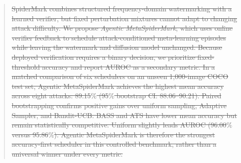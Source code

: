 \begin{abstract}
\sout{
SpiderMark combines structured frequency-domain watermarking with a learned verifier, but fixed perturbation mixtures cannot adapt to changing attack difficulty. We propose \emph{Agentic MetaSpiderMark}, which uses online verifier feedback to schedule attack-conditioned meta-learning episodes while leaving the watermark and diffusion model unchanged. Because deployed verification requires a binary decision, we prioritize fixed-threshold accuracy and report AUROC as a secondary metric. In a matched comparison of six schedulers on an unseen 1,000-image COCO test set, Agentic MetaSpiderMark achieves the highest mean accuracy across eight attacks: 89.15$\%$ (95$\%$ bootstrap CI: 88.06--90.21). Paired bootstrapping confirms positive gains over uniform sampling, Adaptive Sampler, and Bandit-UCB. BASS and ATS have lower mean accuracy but remain statistically competitive. Uniform slightly leads AUROC (96.00$\%$ versus 95.86$\%$). Agentic MetaSpiderMark is therefore the strongest accuracy-first scheduler in this controlled benchmark, rather than a universal winner under every metric.}

\end{abstract}
